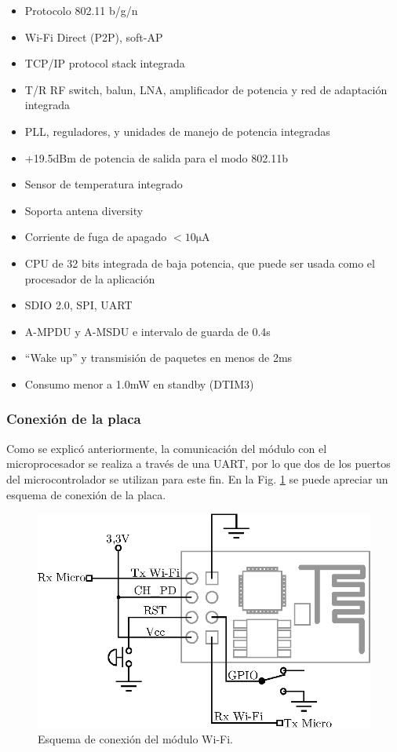 \documentclass[conference,a4paper,9pt]{IEEEtran}
\begin{document}
\begin{itemize}
	\item Protocolo 802.11 b/g/n
	\item Wi-Fi Direct (P2P), soft-AP
	\item TCP/IP protocol stack integrada
	\item T/R RF switch, balun, LNA, amplificador de potencia y red de adaptación integrada
	\item PLL, reguladores, y unidades de manejo de potencia integradas
	\item +19.5dBm de potencia de salida para el modo 802.11b
	\item Sensor de temperatura integrado
	\item Soporta antena diversity
	\item Corriente de fuga de apagado $< 10\mathrm{\mu A}$
	\item CPU de 32 bits integrada de baja potencia, que puede ser usada como el procesador de la aplicación
	\item SDIO 2.0, SPI, UART
	\item A-MPDU y A-MSDU e intervalo de guarda de 0.4s
	\item ``Wake up'' y transmisión de paquetes en menos de 2ms
	\item Consumo menor a 1.0mW en standby (DTIM3)
\end{itemize}

\subsubsection{Conexión de la placa}

Como se explicó anteriormente, la comunicación del módulo con el microprocesador se realiza a través de una UART, por lo que dos de los puertos del microcontrolador se utilizan para este fin. En la Fig. \ref{conexion_wifi} se puede apreciar un esquema de conexión de la placa.

\begin{figure}[H]%
\centering\includegraphics[width=\columnwidth]{conexion_wifi.eps}%
\caption{Esquema de conexión del módulo Wi-Fi.}%
\label{conexion_wifi}%
\end{figure}
\end{document}
